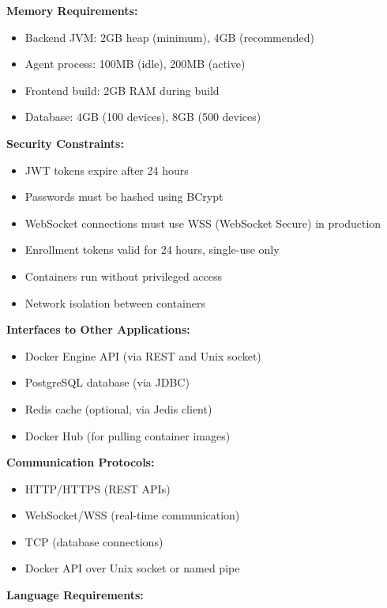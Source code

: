 \documentclass[12pt,a4paper]{article}
\begin{document}
\textbf{Memory Requirements:}

\begin{itemize}[noitemsep]
    \item Backend JVM: 2GB heap (minimum), 4GB (recommended)
    \item Agent process: 100MB (idle), 200MB (active)
    \item Frontend build: 2GB RAM during build
    \item Database: 4GB (100 devices), 8GB (500 devices)
\end{itemize}

\textbf{Security Constraints:}

\begin{itemize}[noitemsep]
    \item JWT tokens expire after 24 hours
    \item Passwords must be hashed using BCrypt
    \item WebSocket connections must use WSS (WebSocket Secure) in production
    \item Enrollment tokens valid for 24 hours, single-use only
    \item Containers run without privileged access
    \item Network isolation between containers
\end{itemize}

\textbf{Interfaces to Other Applications:}

\begin{itemize}[noitemsep]
    \item Docker Engine API (via REST and Unix socket)
    \item PostgreSQL database (via JDBC)
    \item Redis cache (optional, via Jedis client)
    \item Docker Hub (for pulling container images)
\end{itemize}

\textbf{Communication Protocols:}

\begin{itemize}[noitemsep]
    \item HTTP/HTTPS (REST APIs)
    \item WebSocket/WSS (real-time communication)
    \item TCP (database connections)
    \item Docker API over Unix socket or named pipe
\end{itemize}

\textbf{Language Requirements:}
\end{document}
